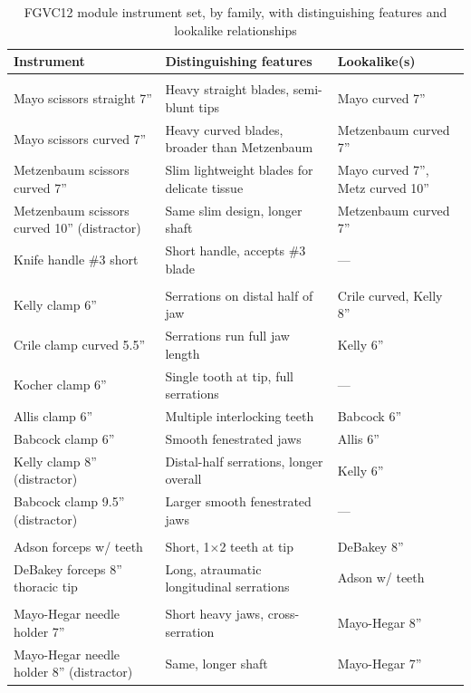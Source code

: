 \documentclass[10pt,a4paper]{article}
\begin{document}
\begin{table}[H]
\centering
\caption{FGVC12 module instrument set, by family, with distinguishing features and lookalike relationships}
\label{tab:fgvc12-module-instruments}
\small\renewcommand{\arraystretch}{1.2}\setlength{\tabcolsep}{3pt}
\begin{tabularx}{\textwidth}{|>{\raggedright\arraybackslash}X|>{\raggedright\arraybackslash}X|>{\raggedright\arraybackslash}X|}
\hline
Instrument & Distinguishing features & Lookalike(s) \\
\hline
\multicolumn{3}{|>{\centering\arraybackslash}X|}{\textbf{Cutting / dissecting}} \\
\hline
Mayo scissors straight 7'' & Heavy straight blades, semi-blunt tips & Mayo curved 7'' \\
Mayo scissors curved 7'' & Heavy curved blades, broader than Metzenbaum & Metzenbaum curved 7'' \\
Metzenbaum scissors curved 7'' & Slim lightweight blades for delicate tissue & Mayo curved 7'', Metz curved 10'' \\
Metzenbaum scissors curved 10'' (distractor) & Same slim design, longer shaft & Metzenbaum curved 7'' \\
Knife handle \#3 short & Short handle, accepts \#3 blade & --- \\
\hline
\multicolumn{3}{|>{\centering\arraybackslash}X|}{\textbf{Clamping / occluding}} \\
\hline
Kelly clamp 6'' & Serrations on distal half of jaw & Crile curved, Kelly 8'' \\
Crile clamp curved 5.5'' & Serrations run full jaw length & Kelly 6'' \\
Kocher clamp 6'' & Single tooth at tip, full serrations & --- \\
Allis clamp 6'' & Multiple interlocking teeth & Babcock 6'' \\
Babcock clamp 6'' & Smooth fenestrated jaws & Allis 6'' \\
Kelly clamp 8'' (distractor) & Distal-half serrations, longer overall & Kelly 6'' \\
Babcock clamp 9.5'' (distractor) & Larger smooth fenestrated jaws & --- \\
\hline
\multicolumn{3}{|>{\centering\arraybackslash}X|}{\textbf{Grasping / holding}} \\
\hline
Adson forceps w/ teeth & Short, 1$\times$2 teeth at tip & DeBakey 8'' \\
DeBakey forceps 8'' thoracic tip & Long, atraumatic longitudinal serrations & Adson w/ teeth \\
\hline
\multicolumn{3}{|>{\centering\arraybackslash}X|}{\textbf{Suturing}} \\
\hline
Mayo-Hegar needle holder 7'' & Short heavy jaws, cross-serration & Mayo-Hegar 8'' \\
Mayo-Hegar needle holder 8'' (distractor) & Same, longer shaft & Mayo-Hegar 7'' \\
\hline
\end{tabularx}
\end{table}
\end{document}
